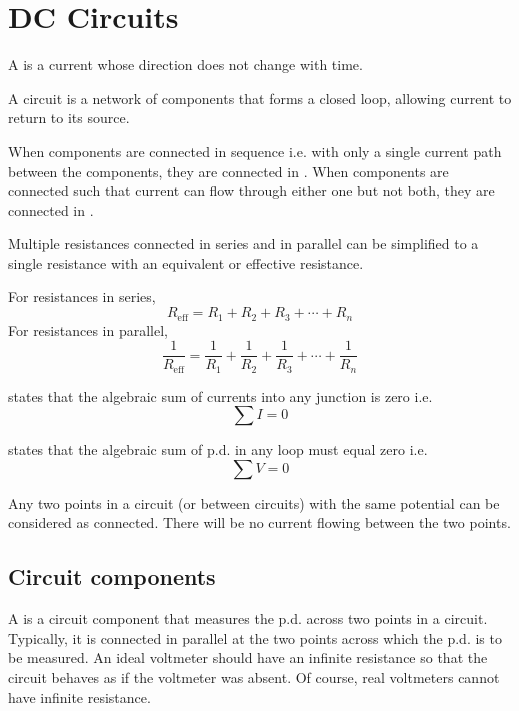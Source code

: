 \documentclass[Physics.tex]{subfiles}
\begin{document}
\chapter{DC Circuits}
A  is a current whose direction does not change with time.

A circuit is a network of components that forms a closed loop, allowing current to return to its source.

When components are connected in sequence i.e. with only a single current path between the components, they are connected in . When components are connected such that current can flow through either one but not both, they are connected in .

Multiple resistances connected in series and in parallel can be simplified to a single resistance with an equivalent or effective resistance.

For resistances in series, \begin{equation}R_{\text{eff}} = R_1 + R_2 + R_3 + \cdots + R_n\end{equation} For resistances in parallel, \begin{equation}\frac{1}{R_{\text{eff}}} = \frac{1}{R_1} + \frac{1}{R_2} + \frac{1}{R_3} + \cdots + \frac{1}{R_n}\end{equation}

 states that the algebraic sum of currents into any junction is zero i.e. \begin{equation}\sum I = 0\end{equation}

 states that the algebraic sum of p.d. in any loop must equal zero i.e. \begin{equation}\sum V = 0\end{equation}

Any two points in a circuit (or between circuits) with the same potential can be considered as connected. There will be no current flowing between the two points.
\section{Circuit components}
A  is a circuit component that measures the p.d. across two points in a circuit. Typically, it is connected in parallel at the two points across which the p.d. is to be measured. An ideal voltmeter should have an infinite resistance so that the circuit behaves as if the voltmeter was absent. Of course, real voltmeters cannot have infinite resistance.
\end{document}

